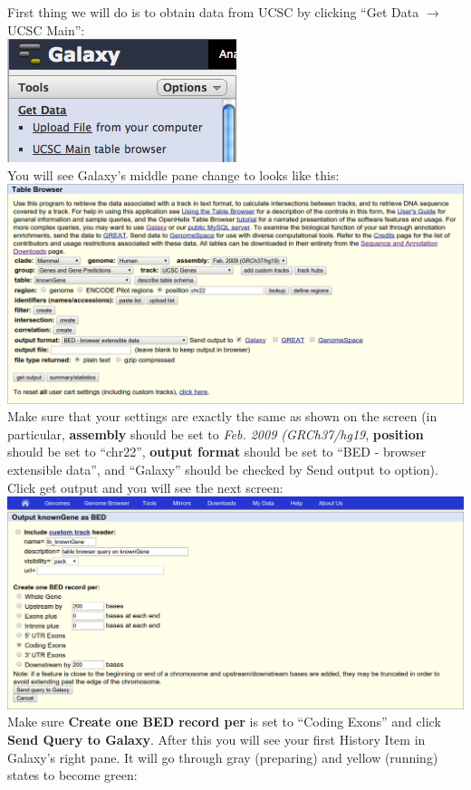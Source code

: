 \documentclass[11pt,a4paper]{article}
\begin{document}
First thing we will do is to obtain data from UCSC by clicking ``Get Data $\rightarrow$ UCSC Main'':\\
\includegraphics[scale=0.65]{figures/101_01} \\
You will see Galaxy's middle pane change to looks like this:\\
\includegraphics[width=\textwidth]{figures/101_02} \\
Make sure that your settings are exactly the same as shown on the screen (in particular, \textbf{assembly} should be set to \textit{Feb. 2009 (GRCh37/hg19}, \textbf{position} should be set to ``chr22'', \textbf{output format} should be set to ``BED - browser extensible data'', and ``Galaxy'' should be checked by Send output to option). Click get output and you will see the next screen:\\
\includegraphics[width=\textwidth]{figures/101_03}\\
Make sure \textbf{Create one BED record per} is set to ``Coding Exons'' and click \textbf{Send Query to Galaxy}. After this you will see your first History Item in Galaxy's right pane. It will go through gray (preparing) and yellow (running) states to become green:\\
\end{document}
